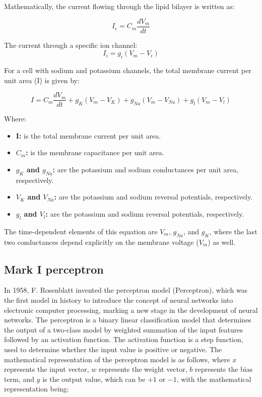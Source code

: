 \documentclass[paper=a4, fontsize=11pt]{scrartcl} %
\numberwithin{equation}{section} %
\numberwithin{figure}{section} %
\numberwithin{table}{section} %
\begin{document}
\vspace{10pt}
Mathematically, the current flowing through the lipid bilayer is written as:

\begin{equation}
    I_{c} = C_{m} \frac{dV_{m}}{dt} 
\end{equation}

The current through a specific ion channel:
\begin{equation}
    I_{i} = g_{i} (V_{m} - V_{i}) 
\end{equation}


For a cell with sodium and potassium channels, the total membrane current per unit area (I) is given by:

\begin{equation}
    I = C_{m} \frac{dV_{m}}{dt} + g_{K} (V_{m} - V_{K}) + g_{Na} (V_{m} - V_{Na}) + g_{l} (V_{m} - V_{l})
\end{equation}


Where:

\begin{itemize}
    \item \textbf{ I:} is the total membrane current per unit area.
    \item \textbf{$C_{m}$:} is the membrane capacitance per unit area.
    \item \textbf{ $g_{K}$ and $g_{Na}$:} are the potassium and sodium conductances per unit area, respectively.
    \item \textbf{$V_{K}$ and $V_{Na}$:} are the potassium and sodium reversal potentials, respectively.
    \item \textbf{$g_{l}$ and $V_{l}$:} are the potassium and sodium reversal potentials, respectively.
\end{itemize}

The time-dependent elements of this equation are \( V_{m} \), \( g_{Na} \), and \( g_{K} \), where the last two conductances depend explicitly on the membrane voltage (\( V_{m} \)) as well.

\subsection{Mark I perceptron}


In 1958, F. Rosenblatt invented the perceptron model (Perceptron), which was the first model in history to introduce the concept of neural networks into electronic computer processing, marking a new stage in the development of neural networks. The perceptron is a binary linear classification model that determines the output of a two-class model by weighted summation of the input features followed by an activation function. The activation function is a step function, used to determine whether the input value is positive or negative. The mathematical representation of the perceptron model is as follows, where \( x \) represents the input vector, \( w \) represents the weight vector, \( b \) represents the bias term, and \( y \) is the output value, which can be \(+1\) or \(-1\), with the mathematical representation being:
\end{document}
